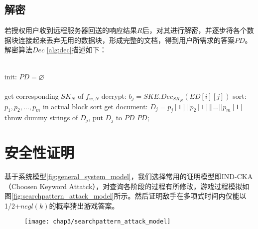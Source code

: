 \subsection{解密}
\label{sec:searchpattern_scheme_decryption}

若授权用户收到远程服务器回送的响应结果$R$后，对其进行解密，并逐步将各个数据块连接起来丢弃无用的数据块，形成完整的文档，得到用户所需求的答案$PD$。解密算法$Dec$ \ref{alg:dec}描述如下：
\begin{algorithm}[!htb]
\caption{$PD \leftarrow Dec(R, K)$}
\label{alg:dec}
\begin{algorithmic} [1]
\ENSURE ~~\\
  \STATE init: $PD = \varnothing $ ~~\\
   ~~\\
    \STATE get corresponding $SK_N$ of $f_{w,N}$
      \STATE decrypt: $ b_j = SKE.Dec_{SK_N}(ED[i][j])$
    \ENDFOR
    \STATE sort: $p_1, p_2, ..., p_m$ in actual block sort
    \STATE get document: $D_j = p_j[1]||p_2[1]||...||p_m[1]$
    \STATE throw dummy strings of $D_j$, put $D_j$ to $PD$
  \ENDFOR
  \RETURN ${PD}$;
\end{algorithmic}
\end{algorithm}





\section{安全性证明}
\label{sec:searchpattern_security_analysis}

基于系统模型\ref{fig:general_system_model}，我们选择常用的证明模型即IND-CKA（Choosen Keyword Attatck），对查询各阶段的过程有所修改，游戏过程模拟如图\ref{fig:searchpattern_attack_model}所示。然后证明敌手在多项式时间内仅能以1/2+$negl(k)$的概率猜出游戏答案。
\begin{figure}[!htp]
  \centering
  \texttt{[image: chap3/searchpattern\_attack\_model]}
\end{figure}

